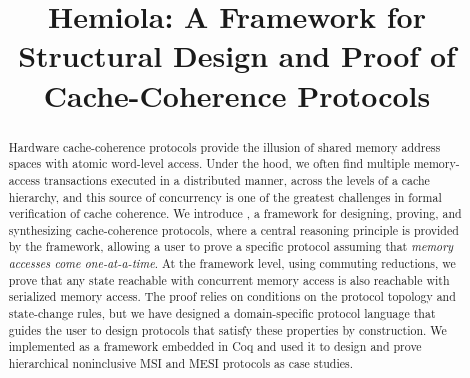 \documentclass[sigplan,10pt,review,anonymous,screen]{acmart}\settopmatter{printfolios=true,printccs=false,printacmref=false}
\begin{document}
\title{Hemiola: A Framework for Structural Design and Proof of Cache-Coherence Protocols}


\begin{abstract}
  Hardware cache-coherence protocols provide the illusion of shared memory address spaces with atomic word-level access.
  Under the hood, we often find multiple memory-access transactions executed in a distributed manner, across the levels of a cache hierarchy, and this source of concurrency is one of the greatest challenges in formal verification of cache coherence.
  We introduce \hemiola{}, a framework for designing, proving, and synthesizing cache-coherence protocols, where a central reasoning principle is provided by the framework, allowing a user to prove a specific protocol assuming that \emph{memory accesses come one-at-a-time}.
  At the framework level, using commuting reductions, we prove that any state reachable with concurrent memory access is also reachable with serialized memory access.
  The proof relies on conditions on the protocol topology and state-change rules, but we have designed a domain-specific protocol language that guides the user to design protocols that satisfy these properties by construction.
  We implemented \hemiola{} as a framework embedded in Coq and used it to design and prove hierarchical noninclusive MSI and MESI protocols as case studies.
\end{abstract}


\newcommand{\todo}[1]{\emph{\textcolor{red}{TODO: #1}}}
\newcommand{\note}[1]{\emph{\textcolor{blue}{NOTE: #1}}}
\newcommand{\panic}[1]{\textbf{\textcolor{red}{(#1)}}}

\renewcommand{\subsectionautorefname}{section}
\renewcommand{\subsubsectionautorefname}{section}

\newcommand{\ie}{i.e.,}
\newcommand{\eg}{e.g.,}
\newcommand{\aka}{a.k.a.}

\newcommand{\tuple}[1]{\langle #1 \rangle}
\renewcommand\qedsymbol{$\blacksquare$}


\newcommand{\hemiola}{Hemiola}
\end{document}
